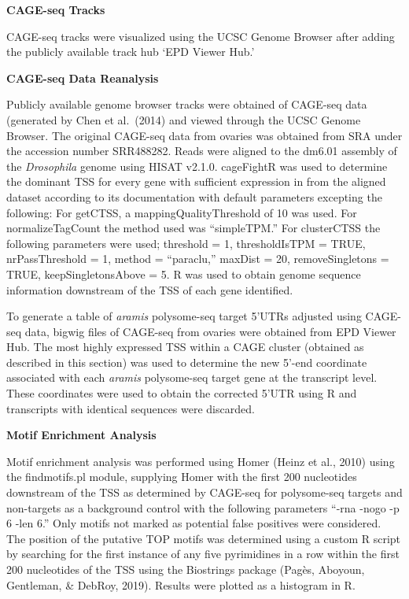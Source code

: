 \documentclass[12pt,oneside]{reedthesis}
\begin{document}
\textbf{CAGE-seq Tracks}

CAGE-seq tracks were visualized using the UCSC Genome Browser after adding the publicly available track hub `EPD Viewer Hub.'

\textbf{CAGE-seq Data Reanalysis}

Publicly available genome browser tracks were obtained of CAGE-seq data (generated by Chen et al.~(2014) and viewed through the UCSC Genome Browser. The original CAGE-seq data from ovaries was obtained from SRA under the accession number SRR488282. Reads were aligned to the dm6.01 assembly of the \emph{Drosophila} genome using HISAT v2.1.0. cageFightR was used to determine the dominant TSS for every gene with sufficient expression in from the aligned dataset according to its documentation with default parameters excepting the following: For getCTSS, a mappingQualityThreshold of 10 was used. For normalizeTagCount the method used was ``simpleTPM.'' For clusterCTSS the following parameters were used; threshold = 1, thresholdIsTPM = TRUE, nrPassThreshold = 1, method = ``paraclu,'' maxDist = 20, removeSingletons = TRUE, keepSingletonsAbove = 5. R was used to obtain genome sequence information downstream of the TSS of each gene identified.

To generate a table of \emph{aramis} polysome-seq target 5'UTRs adjusted using CAGE-seq data, bigwig files of CAGE-seq from ovaries were obtained from EPD Viewer Hub. The most highly expressed TSS within a CAGE cluster (obtained as described in this section) was used to determine the new 5'-end coordinate associated with each \emph{aramis} polysome-seq target gene at the transcript level. These coordinates were used to obtain the corrected 5'UTR using R and transcripts with identical sequences were discarded.

\textbf{Motif Enrichment Analysis}

Motif enrichment analysis was performed using Homer (Heinz et al., 2010) using the findmotifs.pl module, supplying Homer with the first 200 nucleotides downstream of the TSS as determined by CAGE-seq for polysome-seq targets and non-targets as a background control with the following parameters ``-rna -nogo -p 6 -len 6.'' Only motifs not marked as potential false positives were considered. The position of the putative TOP motifs was determined using a custom R script by searching for the first instance of any five pyrimidines in a row within the first 200 nucleotides of the TSS using the Biostrings package (Pagès, Aboyoun, Gentleman, \& DebRoy, 2019). Results were plotted as a histogram in R.
\end{document}
